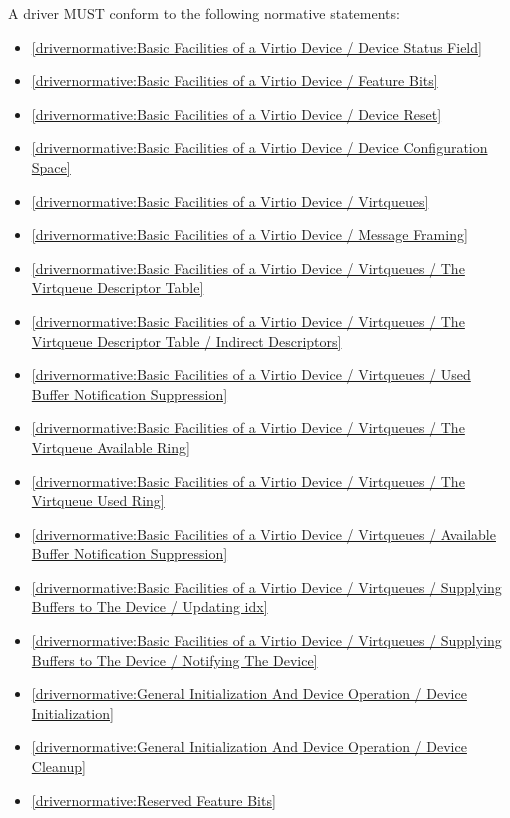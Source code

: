 A driver MUST conform to the following normative statements:

\begin{itemize}
\item \ref{drivernormative:Basic Facilities of a Virtio Device / Device Status Field}
\item \ref{drivernormative:Basic Facilities of a Virtio Device / Feature Bits}
\item \ref{drivernormative:Basic Facilities of a Virtio Device / Device Reset}
\item \ref{drivernormative:Basic Facilities of a Virtio Device / Device Configuration Space}
\item \ref{drivernormative:Basic Facilities of a Virtio Device / Virtqueues}
\item \ref{drivernormative:Basic Facilities of a Virtio Device / Message Framing}
\item \ref{drivernormative:Basic Facilities of a Virtio Device / Virtqueues / The Virtqueue Descriptor Table}
\item \ref{drivernormative:Basic Facilities of a Virtio Device / Virtqueues / The Virtqueue Descriptor Table / Indirect Descriptors}
\item \ref{drivernormative:Basic Facilities of a Virtio Device / Virtqueues / Used Buffer Notification Suppression}
\item \ref{drivernormative:Basic Facilities of a Virtio Device / Virtqueues / The Virtqueue Available Ring}
\item \ref{drivernormative:Basic Facilities of a Virtio Device / Virtqueues / The Virtqueue Used Ring}
\item \ref{drivernormative:Basic Facilities of a Virtio Device / Virtqueues / Available Buffer Notification Suppression}
\item \ref{drivernormative:Basic Facilities of a Virtio Device / Virtqueues / Supplying Buffers to The Device / Updating idx}
\item \ref{drivernormative:Basic Facilities of a Virtio Device / Virtqueues / Supplying Buffers to The Device / Notifying The Device}
\item \ref{drivernormative:General Initialization And Device Operation / Device Initialization}
\item \ref{drivernormative:General Initialization And Device Operation / Device Cleanup}
\item \ref{drivernormative:Reserved Feature Bits}
\end{itemize}

